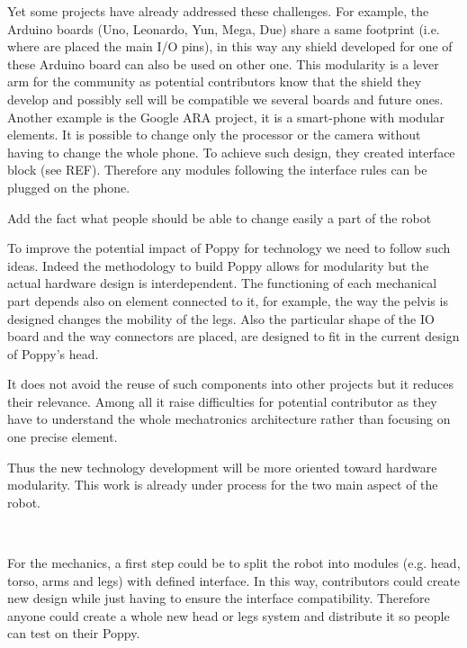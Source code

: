 Yet some projects have already addressed these challenges. For example, the Arduino boards (Uno, Leonardo, Yun, Mega, Due) share a same footprint (i.e. where are placed the main I/O pins), in this way any shield developed for one of these Arduino board can also be used on other one. This modularity is a lever arm for the community as potential contributors know that the shield they develop and possibly sell will be compatible we several boards and future ones.
Another example is the Google ARA project, it is a smart-phone with modular elements. It is possible to change only the processor or the camera without having to change the whole phone. To achieve such design, they created interface block (see REF). Therefore any modules following the interface rules can be plugged on the phone.


Add the fact what people should be able to change easily a part of the robot

To improve the potential impact of Poppy for technology we need to follow such ideas. Indeed the methodology to build Poppy allows for modularity but the actual hardware design is interdependent. The functioning of each mechanical part depends also on element connected to it, for example, the way the pelvis is designed changes the mobility of the legs. Also the particular shape of the IO board and the way connectors are placed, are designed to fit in the current design of Poppy's head.

It does not avoid the reuse of such components into other projects but it reduces their relevance. Among all it raise difficulties for potential contributor as they have to understand the whole mechatronics architecture rather than focusing on one precise element.


Thus the new technology development will be more oriented toward hardware modularity. This work is already under process for the two main aspect of the robot.

\begin{figure}[tb]
\centering
    \hfil
     \\
    \caption{}
    \label{fig:poppy-electronic-modularity}
\end{figure}

For the mechanics, a first step could be to split the robot into modules (e.g. head, torso, arms and legs) with defined interface. In this way, contributors could create new design while just having to ensure the interface compatibility. Therefore anyone could create a whole new head or legs system and distribute it so people can test on their Poppy.

